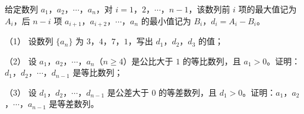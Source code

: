 \begin{question}
给定数列 $a_1$，$a_2$，$\cdots$，$a_n$，对 $i=1$，$2$，$\cdots$，$n-1$，该数列前 $i$ 项的最大值记为 $A_i$，后 $n-i$ 项 $a_{i+1}$，$a_{i+2}$，$\cdots$，$a_n$ 的最小值记为 $B_i$，$d_i=A_i-B_i$。

（1） 设数列 $\{a_n\}$ 为 $3$，$4$，$7$，$1$，写出 $d_1$，$d_2$，$d_3$ 的值；

（2） 设 $a_1$，$a_2$，$\cdots$，$a_n$（$n\geqslant4$）是公比大于 $1$ 的等比数列，且 $a_1>0$。证明：$d_1$，$d_2$，$\cdots$，$d_{n-1}$ 是等比数列；

（3） 设 $d_1$，$d_2$，$\cdots$，$d_{n-1}$ 是公差大于 $0$ 的等差数列，且 $d_1>0$。证明：$a_1$，$a_2$，$\cdots$，$a_{n-1}$ 是等差数列。

\end{question}